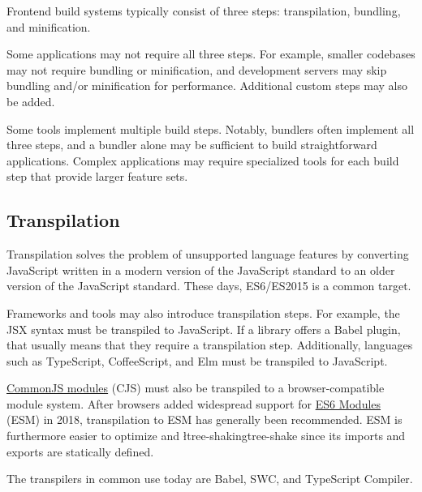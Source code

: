\documentclass{article}
\begin{document}
Frontend build systems typically consist of three steps: transpilation, bundling, and minification.

Some applications may not require all three steps. For example, smaller codebases may not require
bundling or minification, and development servers may skip bundling and/or minification for
performance. Additional custom steps may also be added.

Some tools implement multiple build steps. Notably, bundlers often implement all three steps, and a
bundler alone may be sufficient to build straightforward applications. Complex applications may
require specialized tools for each build step that provide larger feature sets.

\subsection{Transpilation}

Transpilation solves the problem of unsupported language features by converting JavaScript written
in a modern version of the JavaScript standard to an older version of the JavaScript standard. These
days, ES6/ES2015 is a common target.

Frameworks and tools may also introduce transpilation steps. For example, the JSX syntax must be
transpiled to JavaScript. If a library offers a Babel plugin, that usually means that they require a
transpilation step. Additionally, languages such as TypeScript, CoffeeScript, and Elm must be
transpiled to JavaScript.

\href{https://wiki.commonjs.org/wiki/Modules}{CommonJS modules} (CJS) must also be transpiled to a
browser-compatible module system. After browsers added widespread support for
\href{https://exploringjs.com/es6/ch_modules.html}{ES6 Modules} (ESM) in 2018, transpilation to ESM
has generally been recommended. ESM is furthermore easier to optimize and
\l{tree-shaking}{tree-shake} since its imports and exports are statically defined.

The transpilers in common use today are Babel, SWC, and TypeScript Compiler.
\end{document}
